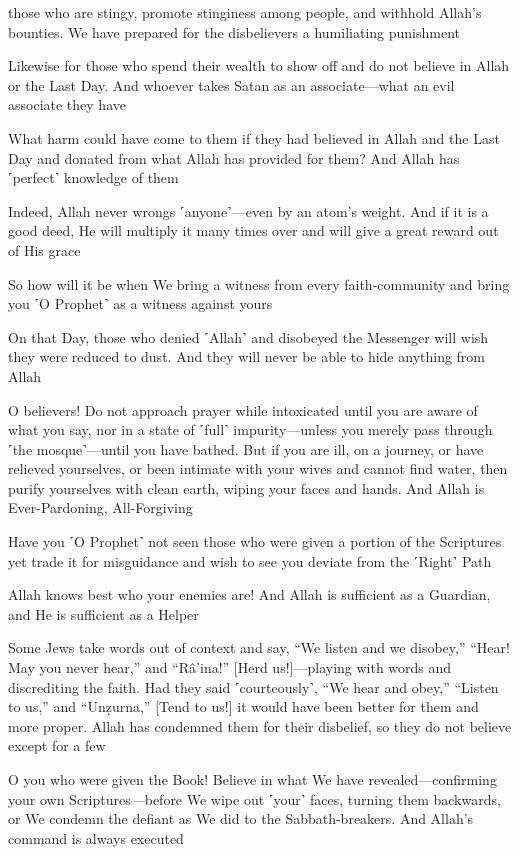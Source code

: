 those who are stingy, promote stinginess among people, and withhold Allah’s bounties. We have prepared for the disbelievers a humiliating punishment

Likewise for those who spend their wealth to show off and do not believe in Allah or the Last Day. And whoever takes Satan as an associate—what an evil associate they have

What harm could have come to them if they had believed in Allah and the Last Day and donated from what Allah has provided for them? And Allah has ˹perfect˺ knowledge of them

Indeed, Allah never wrongs ˹anyone˺—even by an atom’s weight. And if it is a good deed, He will multiply it many times over and will give a great reward out of His grace

So how will it be when We bring a witness from every faith-community and bring you ˹O Prophet˺ as a witness against yours

On that Day, those who denied ˹Allah˺ and disobeyed the Messenger will wish they were reduced to dust. And they will never be able to hide anything from Allah

O believers! Do not approach prayer while intoxicated until you are aware of what you say, nor in a state of ˹full˺ impurity—unless you merely pass through ˹the mosque˺—until you have bathed. But if you are ill, on a journey, or have relieved yourselves, or been intimate with your wives and cannot find water, then purify yourselves with clean earth, wiping your faces and hands. And Allah is Ever-Pardoning, All-Forgiving

Have you ˹O Prophet˺ not seen those who were given a portion of the Scriptures yet trade it for misguidance and wish to see you deviate from the ˹Right˺ Path

Allah knows best who your enemies are! And Allah is sufficient as a Guardian, and He is sufficient as a Helper

Some Jews take words out of context and say, “We listen and we disobey,” “Hear! May you never hear,” and “Râ’ina!” [Herd us!]—playing with words and discrediting the faith. Had they said ˹courteously˺, “We hear and obey,” “Listen to us,” and “Unẓurna,” [Tend to us!] it would have been better for them and more proper. Allah has condemned them for their disbelief, so they do not believe except for a few

O you who were given the Book! Believe in what We have revealed—confirming your own Scriptures—before We wipe out ˹your˺ faces, turning them backwards, or We condemn the defiant as We did to the Sabbath-breakers. And Allah’s command is always executed

